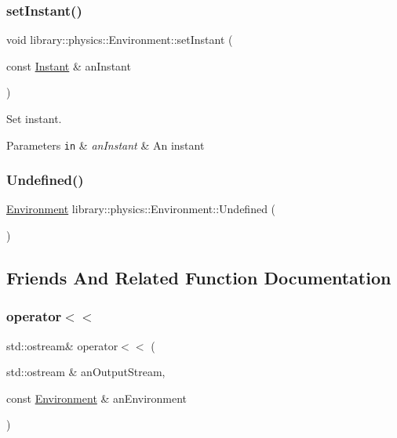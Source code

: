 \subsubsection{\texorpdfstring{set\+Instant()}{setInstant()}}
{\footnotesize\ttfamily void library\+::physics\+::\+Environment\+::set\+Instant (\begin{DoxyParamCaption}\item[{const \hyperlink{classlibrary_1_1physics_1_1time_1_1_instant}{Instant} \&}]{an\+Instant }\end{DoxyParamCaption})}



Set instant. 


\begin{DoxyParams}[1]{Parameters}
\mbox{\tt in}  & {\em an\+Instant} & An instant \\
\hline
\end{DoxyParams}
\mbox{\label{classlibrary_1_1physics_1_1_environment_a8d1dfff3867d59ecdebd3ee6e98a2dab}} 
\subsubsection{\texorpdfstring{Undefined()}{Undefined()}}
{\footnotesize\ttfamily \hyperlink{classlibrary_1_1physics_1_1_environment}{Environment} library\+::physics\+::\+Environment\+::\+Undefined (\begin{DoxyParamCaption}{ }\end{DoxyParamCaption})\hspace{0.3cm}{\ttfamily [static]}}



\subsection{Friends And Related Function Documentation}
\mbox{\label{classlibrary_1_1physics_1_1_environment_a7bc4b39898452fbe5ce3a8de75ad2596}} 
\subsubsection{\texorpdfstring{operator$<$$<$}{operator<<}}
{\footnotesize\ttfamily std\+::ostream\& operator$<$$<$ (\begin{DoxyParamCaption}\item[{std\+::ostream \&}]{an\+Output\+Stream,  }\item[{const \hyperlink{classlibrary_1_1physics_1_1_environment}{Environment} \&}]{an\+Environment }\end{DoxyParamCaption})\hspace{0.3cm}{\ttfamily [friend]}}



